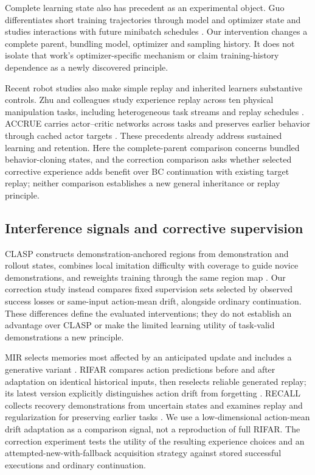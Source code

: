 \documentclass[10pt,letterpaper]{article}
\begin{document}
Complete learning state also has precedent as an experimental object.
Guo differentiates short training trajectories through model and
optimizer state and studies interactions with future minibatch schedules
\cite{guo2026delayedoptimizerstatetransportshapes}. Our intervention
changes a complete parent, bundling model, optimizer and sampling
history. It does not isolate that work's optimizer-specific mechanism or
claim training-history dependence as a newly discovered principle.

Recent robot studies also make simple replay and inherited learners
substantive controls. Zhu and colleagues study experience replay across
ten physical manipulation tasks, including heterogeneous task streams
and replay schedules \cite{zhu2026continualvla}. ACCRUE carries
actor--critic networks across tasks and preserves earlier behavior
through cached actor targets \cite{kim2026accrue}. These precedents
already address sustained learning and retention. Here the
complete-parent comparison concerns bundled behavior-cloning states, and
the correction comparison asks whether selected corrective experience
adds benefit over BC continuation with existing target replay; neither
comparison establishes a new general inheritance or replay principle.

\subsection{Interference signals and corrective
supervision}\label{interference-signals-and-corrective-supervision}

CLASP constructs demonstration-anchored regions from demonstration and rollout states, combines local imitation difficulty with coverage to guide novice demonstrations, and reweights training through the same region map \cite{pmlr-v306-zhu26s}. Our correction study instead compares fixed supervision sets selected by observed success losses or same-input action-mean drift, alongside ordinary continuation. These differences define the evaluated interventions; they do not establish an advantage over CLASP or make the limited learning utility of task-valid demonstrations a new principle.

MIR selects memories most affected by an anticipated update and includes
a generative variant \cite{aljundi2019mir}. RIFAR compares action
predictions before and after adaptation on identical historical inputs,
then reselects reliable generated replay; its latest version explicitly
distinguishes action drift from forgetting \cite{lin2026rifar}. RECALL
collects recovery demonstrations from uncertain states and examines
replay and regularization for preserving earlier tasks
\cite{karli2026recall}. We use a low-dimensional action-mean drift
adaptation as a comparison signal, not a reproduction of full RIFAR. The
correction experiment tests the utility of the resulting experience
choices and an attempted-new-with-fallback acquisition strategy against
stored successful executions and ordinary continuation.
\end{document}

